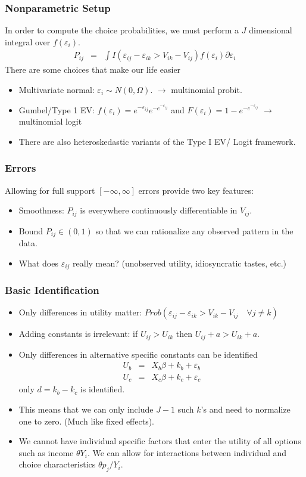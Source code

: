\documentclass[xcolor=pdftex,dvipsnames,table,mathserif]{beamer}
\begin{document}
\begin{frame}
\frametitle{Nonparametric Setup}
In order to compute the choice probabilities, we must perform a $J$ dimensional integral over $f(\varepsilon_i)$.
\begin{eqnarray*}
P_{ij} &=&  \int I( \varepsilon_{ij}-\varepsilon_{ik} > V_{ik} - V_{ij} ) f( \varepsilon_i) \partial \varepsilon_i 
\end{eqnarray*}
There are some choices that make our life easier
\begin{itemize}
\item Multivariate normal: $\varepsilon_i  \sim N(0,\Omega)$. $\longrightarrow$ \alert{ multinomial probit}.
\item Gumbel/Type 1 EV: $f(\varepsilon_i) = e^{-\varepsilon_{ij}}  e^{-e^{-\varepsilon_{ij}}}  $ and $F(\varepsilon_i) = 1- e^{-e^{-\varepsilon_{ij}}}$ $\longrightarrow$ \alert{multinomial logit}
\item There are also heteroskedastic variants of the Type I EV/ Logit framework.
\end{itemize}
\end{frame}

\begin{frame}
\frametitle{Errors}
Allowing for full support $[-\infty, \infty]$ errors provide two key features:
\begin{itemize}
\item Smoothness: $P_{ij}$ is everywhere continuously differentiable in $V_{ij}$.
\item Bound $P_{ij} \in (0,1)$ so that we can rationalize any observed pattern in the data.
\item What does $\varepsilon_{ij}$ really mean? (unobserved utility, idiosyncratic tastes, etc.)
\end{itemize}
\end{frame}

\begin{frame}
\frametitle{Basic Identification}
\small
\begin{itemize}
\item Only differences in utility matter: $Prob( \varepsilon_{ij}-\varepsilon_{ik} > V_{ik} - V_{ij} \quad \forall j \neq k)$
\item Adding constants is irrelevant: if $U_{ij} > U_{ik}$ then $U_{ij} + a > U_{ik} + a$.
\item Only differences in alternative specific constants can be identified
\begin{eqnarray*}
U_b &=& X_b \beta + k_b  + \varepsilon_b\\
U_c &=& X_c \beta + k_c  + \varepsilon_c
\end{eqnarray*}
only $d = k_b - k_c$ is identified.
\item This means that we can only include $J-1$ such $k$'s and need to normalize one to zero. (Much like fixed effects).
\item We cannot have individual specific factors that enter the utility of all options such as income $\theta Y_i$. We can allow for interactions between individual and choice characteristics $\theta p_{j}/ Y_i$.
\end{itemize}
\end{frame}
\end{document}
